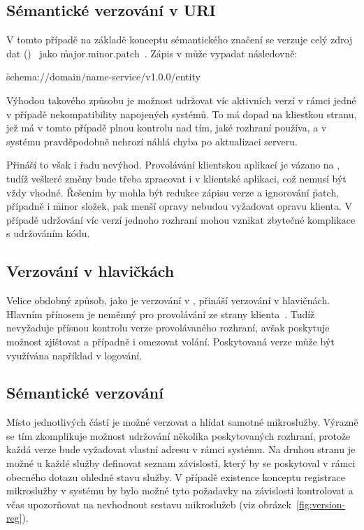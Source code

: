 \subsection{Sémantické verzování v URI}\label{subsec:msa-dependencies-uri}

V tomto případě na základě konceptu sémantického značení se verzuje celý zdroj dat ()~\cite{msversions} jako \h{major.minor.patch}~\cite{semver}.
Zápis v může vypadat následovně:

\h{schema://domain/name-service/v1.0.0/entity}

Výhodou takového způsobu je možnost udržovat víc aktivních  verzí v rámci jedné  v případě nekompatibility napojených systémů.
To má dopad na kliestkou stranu, jež má v tomto případě plnou kontrolu nad tím, jaké rozhraní používa, a v systému pravděpodobně nehrozí náhlá chyba po aktualizaci serveru.

Přináší to však i řadu nevýhod.
Provolávání  klientskou aplikací je vázano na , tudíž veškeré změny bude třeba zpracovat i v klientské aplikaci, což nemusí být vždy vhodné.
Řešením by mohla být redukce zápisu verze a ignorování \h{patch}, případně i \h{minor} složek, pak menší opravy nebudou vyžadovat opravu klienta.
V případě udržování víc verzí jednoho rozhraní mohou vznikat zbytečné komplikace s udržováním kódu.



\subsection{Verzování v hlavičkách }\label{subsec:msa-dependencies-headers}

Velice obdobný způsob, jako je verzování v , přináší verzování v  hlavičnách.
Hlavním přínosem je neměnný  pro provolávání ze strany klienta~\cite{msversions}.
Tudíž nevyžaduje přísnou kontrolu verze provolávaného rozhraní, avšak poskytuje možnost zjištovat a případně i omezovat volání.
Poskytovaná verze může být využívána například v logování.



\subsection{Sémantické verzování }\label{subsec:msa-dependencies-msa}
Místo jednotlivých částí  je možné verzovat a hlídat samotné mikroslužby.
Výrazně se tím zkomplikuje možnost udržování několika poskytovaných rozhraní, protože každá verze bude vyžadovat vlastní adresu v rámci systému.
Na druhou stranu je možné u každé služby definovat seznam závislostí, který by se poskytoval v rámci obecného dotazu ohledně stavu služby.
V případě existence konceptu registrace mikroslužby v systému by bylo možné tyto požadavky na závislosti kontrolovat a včas upozorňovat na nevhodnout sestavu mikroslužeb (viz obrázek~\ref{fig:version-reg}).

